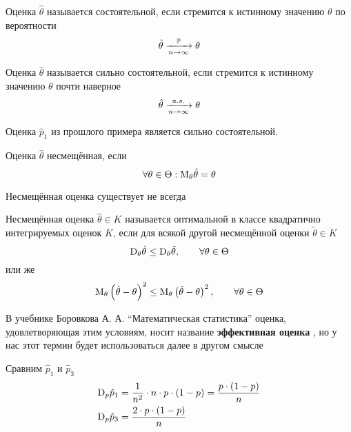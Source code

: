 \begin{definition}
    Оценка $\hat{\theta}$ называется состоятельной,
    если стремится к истинному значению $\theta$ по вероятности
    $$\hat{\theta}\xrightarrow[n\to\infty]{\mathbb{P}}\theta$$
\end{definition}
\begin{definition}
    Оценка $\hat{\theta}$ называется сильно состоятельной,
    если стремится к истинному значению $\theta$ почти наверное
    $$\hat{\theta}\xrightarrow[n\to\infty]{a.s.}\theta$$
\end{definition}
\begin{example}
    Оценка $\hat{p}_1$ из прошлого примера является сильно состоятельной.
\end{example}
\begin{definition}
    Оценка $\hat{\theta}$ несмещённая, если
    $$\forall\theta\in\Theta: \mathrm{M}_{\theta} \hat{\theta}=\theta$$
\end{definition}
\begin{remark}Несмещённая оценка существует не всегда
\end{remark}
\begin{definition}Несмещённая оценка $\hat{\theta}\in K$
называется оптимальной
в классе квадратично интегрируемых оценок $K$,
если для всякой другой несмещённой оценки $\tilde{\theta}\in K$
$$\mathrm{D}_{\theta} \hat{\theta}\le\mathrm{D}_{\theta} \tilde{\theta},
\qquad \forall\theta\in\Theta$$
или же
$$\mathrm{M}_{\theta} \left(\hat{\theta}-\theta\right)^2
\le\mathrm{M}_{\theta} \left(\tilde{\theta}-\theta\right)^2,
\qquad \forall\theta\in\Theta$$
\end{definition}
\begin{remark}
    В учебнике Боровкова А. А. ``Математическая статистика'' 
    оценка, удовлетворяющая этим условиям,
    носит название \textbf{эффективная оценка} \cite[стр.~130]{BorovkovMS},
    но у нас этот термин будет использоваться далее в другом смысле
\end{remark}
\begin{example}Сравним $\hat{p}_1$ и $\hat{p}_3$
    \begin{align*}
    \mathrm{D}_{p} \hat{p}_1
        &=\frac{1}{n^2}\cdot n\cdot p\cdot\left(1-p\right)
        =\frac{p\cdot\left(1-p\right)}{n}\\
    \mathrm{D}_{p} \hat{p}_3
        &=\frac{2\cdot p\cdot\left(1-p\right)}{n}
    \end{align*}
\end{example}
